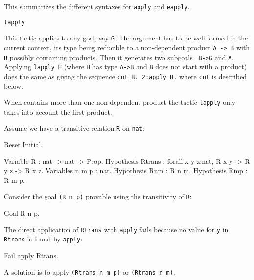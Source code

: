 \begin{coq_example*}
\begin{Variants}
  This summarizes the different syntaxes for {\tt apply} and {\tt eapply}.

\item {\tt lapply {\term}} 

  This tactic applies to any goal, say {\tt G}.  The argument {\term}
  has to be well-formed in the current context, its type being
  reducible to a non-dependent product {\tt A -> B} with {\tt B}
  possibly containing products. Then it generates two subgoals {\tt
  B->G} and {\tt A}. Applying {\tt lapply H} (where {\tt H} has type
  {\tt A->B} and {\tt B} does not start with a product) does the same
  as giving the sequence {\tt cut B. 2:apply H.} where {\tt cut} is
  described below.

  \Warning When {\term} contains more than one non
  dependent product the tactic {\tt lapply} only takes into account the
  first product.

\end{Variants}

\Example
Assume we have a transitive relation {\tt R} on {\tt nat}:
\label{eapply-example}

\begin{coq_eval}
Reset Initial.
\end{coq_eval}
\begin{coq_example*}
Variable R : nat -> nat -> Prop.
Hypothesis Rtrans : forall x y z:nat, R x y -> R y z -> R x z.
Variables n m p : nat.
Hypothesis Rnm : R n m.
Hypothesis Rmp : R m p.
\end{coq_example*}

Consider the goal {\tt (R n p)} provable using the transitivity of
{\tt R}:

\begin{coq_example*}
Goal R n p.
\end{coq_example*}

The direct application of {\tt Rtrans} with {\tt apply} fails because
no value for {\tt y} in {\tt Rtrans} is found by {\tt apply}:

\begin{coq_example}
Fail apply Rtrans.
\end{coq_example}

A solution is to apply {\tt (Rtrans n m p)} or {\tt (Rtrans n m)}.


\end{coq_example*}

